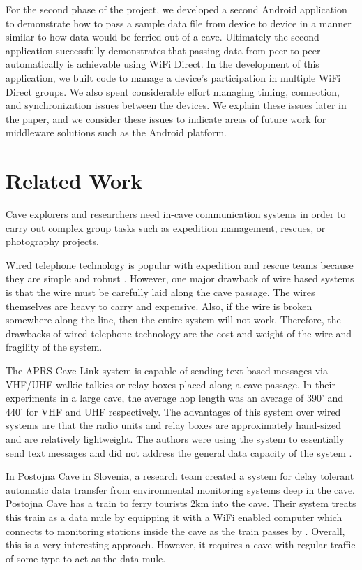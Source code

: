\documentclass[10pt,twocolumn]{article}
\begin{document}
For the second phase of the project, we developed a second Android application to demonstrate how to pass a sample data file from device to device in a manner similar to how data would be ferried out of a cave.
Ultimately the second application successfully demonstrates that passing data from peer to peer automatically is achievable using WiFi Direct. 
In the development of this application, we built code to manage a device's participation in multiple WiFi Direct groups.
We also spent considerable effort managing timing, connection, and synchronization issues between the devices.
We explain these issues later in the paper, and we consider these issues to indicate areas of future work for middleware solutions
such as the Android platform.

\section{Related Work}
\label{sec:Related}
Cave explorers and researchers need in-cave communication systems in order to carry out complex group tasks such as expedition management, rescues, or photography projects.

Wired telephone technology is popular with expedition and rescue teams because they are simple and robust \cite{cavecomm}.
However, one major drawback of wire based systems is that the wire must be carefully laid along the cave passage. 
The wires themselves are heavy to carry and expensive.
Also, if the wire is broken somewhere along the line, then the entire system will not work.
Therefore, the drawbacks of wired telephone technology are the cost and weight of the wire and fragility of the system.

The APRS Cave-Link system is capable of sending text based messages via VHF/UHF walkie talkies or relay boxes placed along a cave passage.
In their experiments in a large cave, the average hop length was an average of 390' and 440' for VHF and UHF respectively.
The advantages of this system over wired systems are that the radio units and relay boxes are approximately hand-sized and are relatively lightweight.
The authors were using the system to essentially send text messages and did not address the general data capacity of the system \cite{cavelink}.

In Postojna Cave in Slovenia, a research team created a system for delay tolerant automatic data transfer from environmental monitoring systems deep in the cave.
Postojna Cave has a train to ferry tourists 2km into the cave.
Their system treats this train as a data mule by equipping it with a WiFi enabled computer which connects to monitoring stations inside the cave as the train passes by \cite{postojna2014}.
Overall, this is a very interesting approach. 
However, it requires a cave with regular traffic of some type to act as the data mule.
\end{document}
